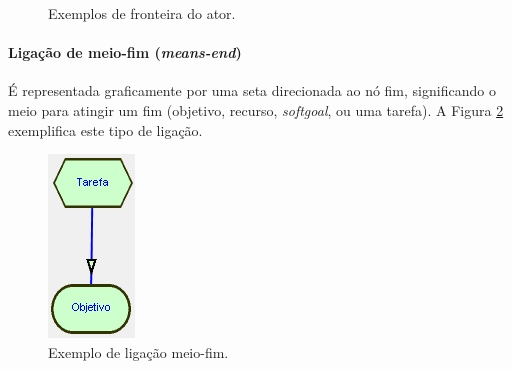                 \begin{figure}[h!]
                    \centering
                        \caption{Exemplos de fronteira do ator.}
                        \label{fig:boundary}
                \end{figure}

            \paragraph{Ligação de meio-fim (\emph{means-end})}
                    É representada graficamente por uma seta direcionada ao nó fim, significando o meio para atingir um fim (objetivo, recurso, \emph{softgoal}, ou uma tarefa). A Figura \ref{fig:means-end} exemplifica este tipo de ligação.
                    \begin{figure}[h!]
                        \centering
                            \includegraphics[scale=1]{Figuras/istar/means-end.jpg}
                            \caption{Exemplo de ligação meio-fim.}
                            \label{fig:means-end}
                    \end{figure}
